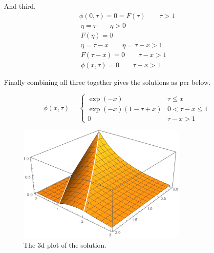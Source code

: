 \documentclass[paper=a4, fontsize=11pt]{scrartcl} %
\numberwithin{equation}{section} %
\numberwithin{figure}{section} %
\numberwithin{table}{section} %
\begin{document}
And third.
\begin{align}
	\phi(0,\tau) = 0 = F(\tau) \qquad \tau > 1\\
	~
	\eta = \tau \qquad \eta > 0\\
	~
	F(\eta)= 0 \\
	~
	\eta = \tau-x \qquad \eta = \tau-x>1\\
	~
	F(\tau-x) = 0 \qquad \tau -x >1\\
	~
	\phi(x,\tau) = 0 \qquad \tau-x > 1
\end{align}

Finally combining all three together gives the solutions as per below.

\[
	\phi(x,\tau) = \begin{cases}
		\exp(-x) & \tau \le x\\
		\exp(-x)(1-\tau+x) & 0< \tau-x \le 1 \\
		0 & \tau-x > 1
	\end{cases}
\]
\begin{figure}[H]\label{prob3:3d}
	\centering
	\includegraphics[width=0.75\textwidth]{bvp4}
	\caption{The 3d plot of the solution.}
\end{figure}
\end{document}

